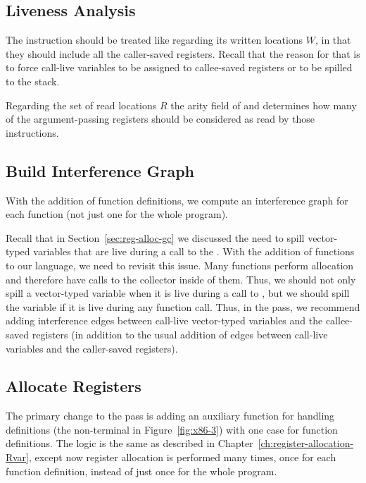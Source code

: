 \documentclass[11pt]{book}
\begin{document}
\subsection{Liveness Analysis}
\label{sec:liveness-analysis-r4}


The  instruction should be treated like
 regarding its written locations $W$, in that they should
include all the caller-saved registers. Recall that the reason for
that is to force call-live variables to be assigned to callee-saved
registers or to be spilled to the stack.

Regarding the set of read locations $R$ the arity field of
 and  determines how many of the
argument-passing registers should be considered as read by those
instructions.

\subsection{Build Interference Graph}
\label{sec:build-interference-r4}

With the addition of function definitions, we compute an interference
graph for each function (not just one for the whole program).

Recall that in Section~\ref{sec:reg-alloc-gc} we discussed the need to
spill vector-typed variables that are live during a call to the
.  With the addition of functions to our language, we
need to revisit this issue. Many functions perform allocation and
therefore have calls to the collector inside of them. Thus, we should
not only spill a vector-typed variable when it is live during a call
to , but we should spill the variable if it is live
during any function call. Thus, in the  pass,
we recommend adding interference edges between call-live vector-typed
variables and the callee-saved registers (in addition to the usual
addition of edges between call-live variables and the caller-saved
registers).


\subsection{Allocate Registers}

The primary change to the  pass is adding an
auxiliary function for handling definitions (the \Def{} non-terminal
in Figure~\ref{fig:x86-3}) with one case for function definitions. The
logic is the same as described in
Chapter~\ref{ch:register-allocation-Rvar}, except now register
allocation is performed many times, once for each function definition,
instead of just once for the whole program.
\end{document}
